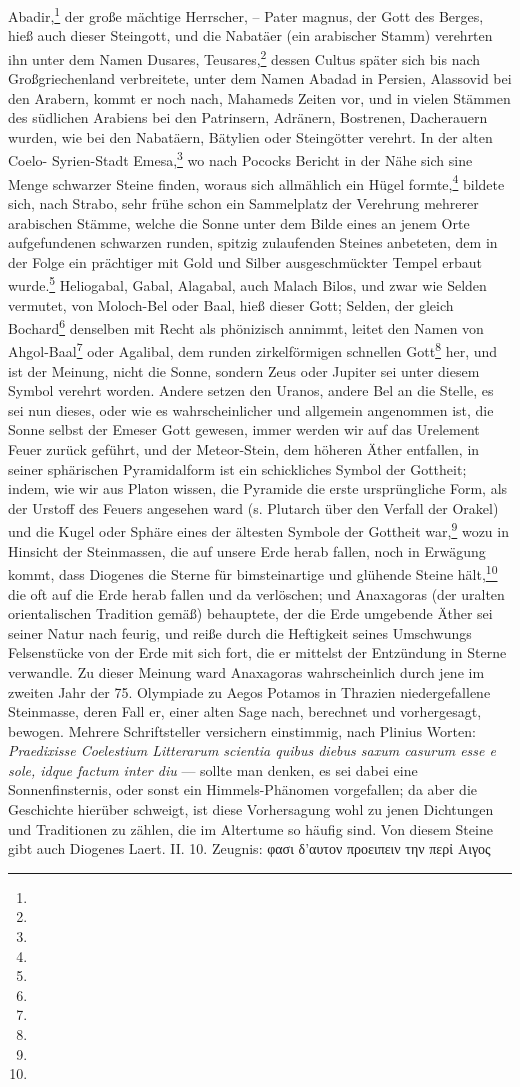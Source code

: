 \documentclass[a4paper, 11pt, oneside, polutonikogreek, german]{article}
\begin{document}
Abadir,\footnote{} der große mächtige Herrscher, -- Pater magnus, der Gott des Berges, hieß auch dieser Steingott, und die Nabatäer (ein arabischer Stamm) verehrten ihn unter dem Namen Dusares, Teusares,\footnote{} dessen Cultus später sich bis nach Großgriechenland verbreitete, unter dem Namen Abadad in Persien, Alassovid bei den Arabern, kommt er noch nach, Mahameds Zeiten vor, und in vielen Stämmen des südlichen Arabiens bei den Patrinsern, Adränern, Bostrenen, Dacherauern wurden, wie bei den Nabatäern, Bätylien oder Steingötter verehrt. In der alten Coelo- Syrien-Stadt Emesa,\footnote{} wo nach Pococks Bericht in der Nähe sich sine Menge schwarzer Steine finden, woraus sich allmählich ein Hügel formte,\footnote{} bildete sich, nach Strabo, sehr frühe schon ein Sammelplatz der Verehrung mehrerer arabischen Stämme, welche die Sonne unter dem Bilde eines an jenem Orte aufgefundenen schwarzen runden, spitzig zulaufenden Steines anbeteten, dem in der Folge ein prächtiger mit Gold und Silber ausgeschmückter Tempel erbaut wurde.\footnote{} Heliogabal, Gabal, Alagabal, auch Malach Bilos, und zwar wie Selden vermutet, von Moloch-Bel oder Baal, hieß dieser Gott; Selden, der gleich Bochard\footnote{} denselben mit Recht als phönizisch annimmt, leitet den Namen von Ahgol-Baal\footnote{} oder Agalibal, dem runden zirkelförmigen schnellen Gott\footnote{} her, und ist der Meinung, nicht die Sonne, sondern Zeus oder Jupiter sei unter diesem Symbol verehrt worden. Andere setzen den Uranos, andere Bel an die Stelle, es sei nun dieses, oder wie es wahrscheinlicher und allgemein angenommen ist, die Sonne selbst der Emeser Gott gewesen, immer werden wir auf das Urelement Feuer zurück geführt, und der Meteor-Stein, dem höheren Äther entfallen, in seiner sphärischen Pyramidalform ist ein schickliches Symbol der Gottheit; indem, wie wir aus Platon wissen, die Pyramide die erste ursprüngliche Form, als der Urstoff des Feuers angesehen ward (s. Plutarch über den Verfall der Orakel) und die Kugel oder Sphäre eines der ältesten Symbole der Gottheit war,\footnote{} wozu in Hinsicht der Steinmassen, die auf unsere Erde herab fallen, noch in Erwägung kommt, dass Diogenes die Sterne für bimsteinartige und glühende Steine hält,\footnote{} die oft auf die Erde herab fallen und da verlöschen; und Anaxagoras (der uralten orientalischen Tradition gemäß) behauptete, der die Erde umgebende Äther sei seiner Natur nach feurig, und reiße durch die Heftigkeit seines Umschwungs Felsenstücke von der Erde mit sich fort, die er mittelst der Entzündung in Sterne verwandle. Zu dieser Meinung ward Anaxagoras wahrscheinlich durch jene im zweiten Jahr der 75. Olympiade zu Aegos Potamos in Thrazien niedergefallene Steinmasse, deren Fall er, einer alten Sage nach, berechnet und vorhergesagt, bewogen. Mehrere Schriftsteller versichern einstimmig, nach Plinius Worten: \emph{Praedixisse Coelestium Litterarum scientia quibus diebus saxum casurum esse e sole, idque factum inter diu} --- sollte man denken, es sei dabei eine Sonnenfinsternis, oder sonst ein Himmels-Phänomen vorgefallen; da aber die Geschichte hierüber schweigt, ist diese Vorhersagung wohl zu jenen Dichtungen und Traditionen zu zählen, die im Altertume so häufig sind. Von diesem Steine gibt auch Diogenes Laert. II. 10. Zeugnis: φασι δ'αυτον προειπειν την περἰ Αιγος 
\end{document}
